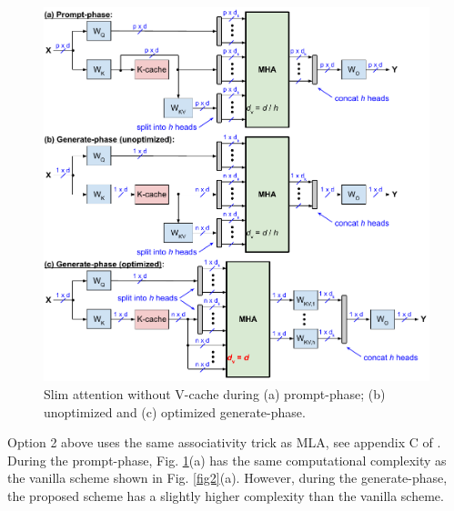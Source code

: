 \documentclass{article}
\begin{document}
\begin{figure}[h!] \centering
  \includegraphics[scale=0.88]{../doc/fig/slimAttn_fig3.pdf}
  \caption{Slim attention without V-cache during (a) prompt-phase; (b) unoptimized and (c) optimized generate-phase.}
\label{fig3} \end{figure}

Option 2 above uses the same associativity trick as MLA, see appendix C of \citep{deepseek-v2}. During the prompt-phase, Fig. \ref{fig3}(a) has the same computational complexity as the vanilla scheme shown in Fig. \ref{fig2}(a). However, during the generate-phase, the proposed scheme has a slightly higher complexity than the vanilla scheme.
\end{document}
